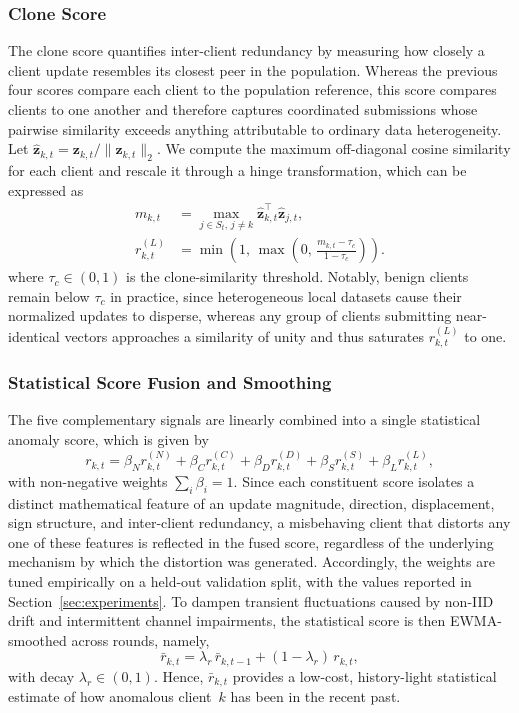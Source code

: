 \documentclass[journal]{IEEEtran}
\begin{document}
\subsubsection{Clone Score}
The clone score quantifies inter-client redundancy by measuring how closely a client update resembles its closest peer in the population. Whereas the previous four scores compare each client to the population reference, this score compares clients to one another and therefore captures coordinated submissions whose pairwise similarity exceeds anything attributable to ordinary data heterogeneity. Let $\hat{\mathbf{z}}_{k,t} = \mathbf{z}_{k,t} / \|\mathbf{z}_{k,t}\|_2$. We compute the maximum off-diagonal cosine similarity for each client and rescale it through a hinge transformation, which can be expressed as
\begin{equation}
\begin{aligned}
m_{k,t} &= \max_{j \in S_t,\, j \neq k} \hat{\mathbf{z}}_{k,t}^{\!\top} \hat{\mathbf{z}}_{j,t}, \\
r_{k,t}^{(L)} &= \min\!\left(1,\, \max\!\left(0,\, \frac{m_{k,t} - \tau_c}{1 - \tau_c}\right)\right).
\end{aligned}
\label{eq:clone_score}
\end{equation}
where $\tau_c \in (0,1)$ is the clone-similarity threshold. Notably, benign clients remain below $\tau_c$ in practice, since heterogeneous local datasets cause their normalized updates to disperse, whereas any group of clients submitting near-identical vectors approaches a similarity of unity and thus saturates $r_{k,t}^{(L)}$ to one.

\subsubsection{Statistical Score Fusion and Smoothing}
The five complementary signals are linearly combined into a single statistical anomaly score, which is given by
\begin{equation}
r_{k,t} = \beta_N r_{k,t}^{(N)} + \beta_C r_{k,t}^{(C)} + \beta_D r_{k,t}^{(D)} + \beta_S r_{k,t}^{(S)} + \beta_L r_{k,t}^{(L)},
\label{eq:stat_score}
\end{equation}
with non-negative weights $\sum_i \beta_i = 1$. Since each constituent score isolates a distinct mathematical feature of an update magnitude, direction, displacement, sign structure, and inter-client redundancy, a misbehaving client that distorts any one of these features is reflected in the fused score, regardless of the underlying mechanism by which the distortion was generated. Accordingly, the weights are tuned empirically on a held-out validation split, with the values reported in Section~\ref{sec:experiments}. To dampen transient fluctuations caused by non-IID drift and intermittent channel impairments, the statistical score is then EWMA-smoothed across rounds, namely,
\begin{equation}
\bar r_{k,t} = \lambda_r\,\bar r_{k,t-1} + (1-\lambda_r)\,r_{k,t},
\label{eq:stat_ewma}
\end{equation}
with decay $\lambda_r \in (0,1)$. Hence, $\bar r_{k,t}$ provides a low-cost, history-light statistical estimate of how anomalous client~$k$ has been in the recent past.
\end{document}
